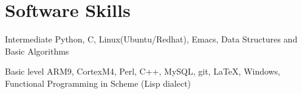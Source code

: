 \documentclass{tccv}
\begin{document}
\section{Software Skills}    %

\begin{factlist}

\item{Intermediate}{
    Python, C, Linux(Ubuntu/Redhat), Emacs, Data Structures and Basic Algorithms
  }

\item{Basic level}{
    ARM9, CortexM4, Perl, C++, MySQL, git, \LaTeX, Windows, Functional Programming in Scheme (Lisp dialect)
  }
  

\end{factlist}
\end{document}
